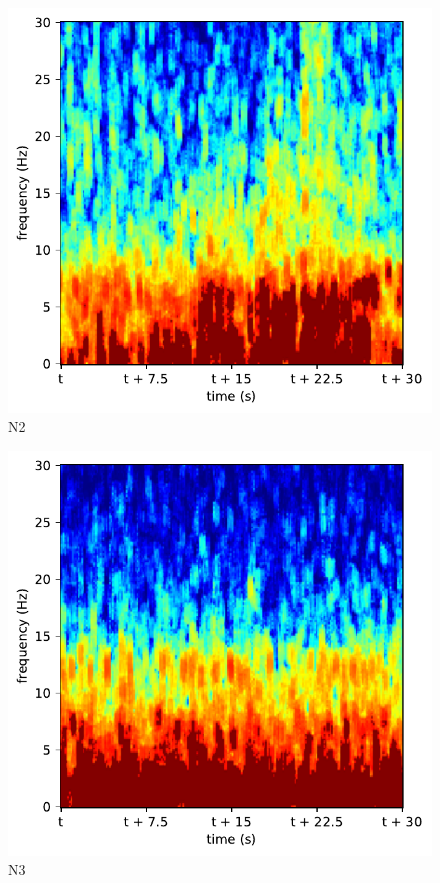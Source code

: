\begin{subfigure}{.16\textwidth}
  \centering
  \includegraphics[width=1\linewidth]{./../Article/pics/class_clean_2}
  \caption{N2}
  \label{fig_1_13}
\end{subfigure}%
\begin{subfigure}{.16\textwidth}
  \centering
  \includegraphics[width=1\linewidth]{./../Article/pics/class_clean_3}
  \caption{N3}
  \label{fig_1_14}
\end{subfigure}%
